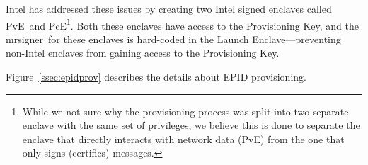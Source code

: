 \documentclass[letterpaper]{article}
\newcommand{\mrsigner}{\textsf{mrsigner}}
\newcommand{\pve}{\textsf{PvE}}
\newcommand{\pce}{\textsf{PcE}}
\newcommand{\launchenclave}{\textsf{Launch Enclave}}
\begin{document}
  Intel has addressed these issues by creating two Intel signed
  enclaves called \pve\ and \pce\footnote{While we not sure why the
    provisioning process was split into two separate enclave with the
    same set of privileges, we believe this is done to separate the
    enclave that directly interacts with network data (\pve) from the
    one that only signs (certifies) messages.}. Both these enclaves
  have access to the Provisioning Key, and the \mrsigner\ for these
  enclaves is hard-coded in the \launchenclave---preventing non-Intel
  enclaves from gaining access to the Provisioning Key.

  Figure~\ref{ssec:epidprov} describes the details about EPID
  provisioning.
 
 
\end{document}

